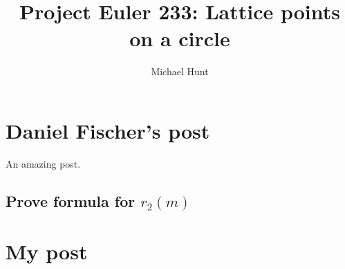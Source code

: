 \documentclass[11pt, oneside]{article}   	%
\title{Project Euler 233: Lattice points on a circle}
\author{Michael Hunt}
\begin{document}
\maketitle
\section{Daniel Fischer's post}

An amazing post.

\subsection{Prove formula for $r_2(m)$ }

\section{My post}
\end{document}

